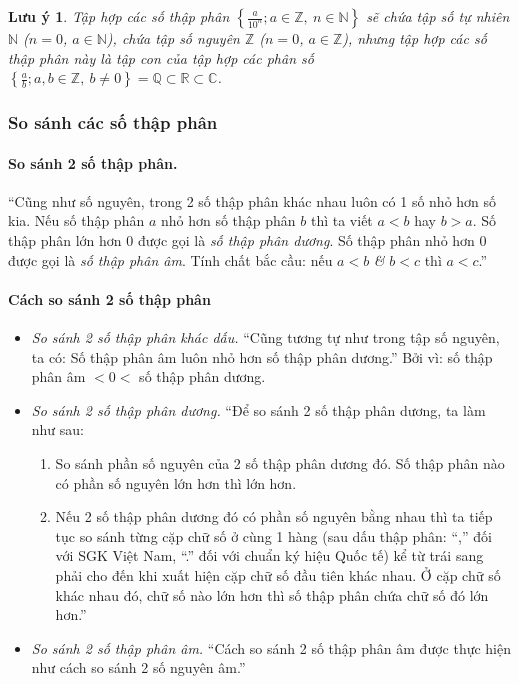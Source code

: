 \documentclass{article}
\numberwithin{equation}{section}
\newtheorem{remark}{Lưu ý}[section]
\begin{document}
\begin{remark}
	Tập hợp các số thập phân $\left\{\frac{a}{10^n};a\in\mathbb{Z},\ n\in\mathbb{N}\right\}$ sẽ chứa tập số tự nhiên $\mathbb{N}$ ($n = 0$, $a\in\mathbb{N}$), chứa tập số nguyên $\mathbb{Z}$ ($n = 0$, $a\in\mathbb{Z}$), nhưng tập hợp các số thập phân này là tập con của tập hợp các phân số $\left\{\frac{a}{b};a,b\in\mathbb{Z},\ b\ne 0\right\} = \mathbb{Q}\subset\mathbb{R}\subset\mathbb{C}$.
\end{remark}

\subsubsection{So sánh các số thập phân}

\paragraph{So sánh 2 số thập phân.} ``Cũng như số nguyên, trong 2 số thập phân khác nhau luôn có 1 số nhỏ hơn số kia. Nếu số thập phân $a$ nhỏ hơn số thập phân $b$ thì ta viết $a < b$ hay $b > a$. Số thập phân lớn hơn 0 được gọi là \emph{số thập phân dương}. Số thập phân nhỏ hơn 0 được gọi là \emph{số thập phân âm}. Tính chất bắc cầu: nếu $a < b$ \textit{\&} $b < c$ thì $a < c$.'' \cite[p. 45]{Thai_Anh_Dat_Ha_Loan_Nam_Quang_Toan_6_tap_2}

\paragraph{Cách so sánh 2 số thập phân}
\begin{itemize}
	\item \textit{So sánh 2 số thập phân khác dấu.} ``Cũng tương tự như trong tập số nguyên, ta có: Số thập phân âm luôn nhỏ hơn số thập phân dương.'' Bởi vì: số thập phân âm $< 0 <$ số thập phân dương.
	\item \textit{So sánh 2 số thập phân dương.} ``Để so sánh 2 số thập phân dương, ta làm như sau:
	\begin{enumerate}
		\item So sánh phần số nguyên của 2 số thập phân dương đó. Số thập phân nào có phần số nguyên lớn hơn thì lớn hơn.
		\item Nếu 2 số thập phân dương đó có phần số nguyên bằng nhau thì ta tiếp tục so sánh từng cặp chữ số ở cùng 1 hàng (sau dấu thập phân: ``,'' đối với SGK Việt Nam, ``.'' đối với chuẩn ký hiệu Quốc tế) kể từ trái sang phải cho đến khi xuất hiện cặp chữ số đầu tiên khác nhau. Ở cặp chữ số khác nhau đó, chữ số nào lớn hơn thì số thập phân chứa chữ số đó lớn hơn.'' 
	\end{enumerate}
	\item \textit{So sánh 2 số thập phân âm.} ``Cách so sánh 2 số thập phân âm được thực hiện như cách so sánh 2 số nguyên âm.'' 
\end{itemize}
\end{document}
